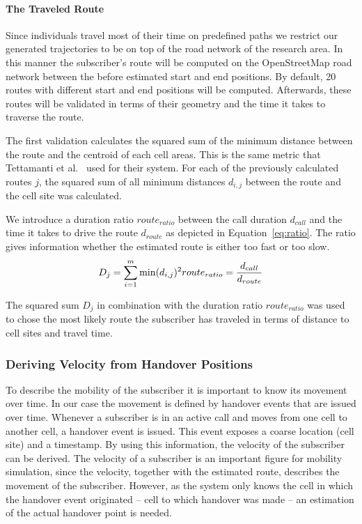 \paragraph{The Traveled Route}
Since individuals travel most of their time on predefined paths we restrict our generated trajectories to be on top of the road network of the research area. In this manner the subscriber's route will be computed on the OpenStreetMap road network between the before estimated start and end positions. By default, 20 routes with different start and end positions will be computed. Afterwards, these routes will be validated in terms of their geometry and the time it takes to traverse the route.

The first validation calculates the squared sum of the minimum distance between the route and the centroid of each cell areas. This is the same metric that Tettamanti et al.~\cite{Tettamanti2012} used for their system. For each of the previously calculated routes $j$, the squared sum of all minimum distances $d_{i,j}$ between the
route and the cell site was calculated.

We introduce a duration ratio $route_{ratio}$ between the call duration $d_{call}$ and the time it takes to drive the route $d_{route}$ as depicted in Equation~\ref{eq:ratio}. The ratio gives information whether the estimated route is either too fast or too slow. 
\begin{equation}
	D_j            =\sum_{i=1}^{m} \min(d_{i,j})^{2} \label{eq:sumsquaremine} \\
	route_{ratio}  =\frac{d_{call}}{d_{route}} \label{eq:ratio}               
\end{equation} 

The squared sum $D_j$ in combination with the duration ratio $route_{ratio}$ was used to chose the most likely route the subscriber has traveled in terms of distance to cell sites and travel time.
\subsubsection{Deriving Velocity from Handover Positions}
To describe the mobility of the subscriber it is important to know its movement over time. In our case the movement is defined by handover events that are issued over time. Whenever a subscriber is in an active call and moves from one cell to another cell, a handover event is issued. This event exposes a coarse location (cell site) and a timestamp. By using this information, the velocity of the subscriber can be derived. The velocity of a subscriber is an important figure for mobility simulation, since the velocity, together with the estimated route, describes the movement of the subscriber. However, as the system only knows the cell in which the handover event originated -- cell to which handover was made -- an estimation of the actual handover point is needed.
